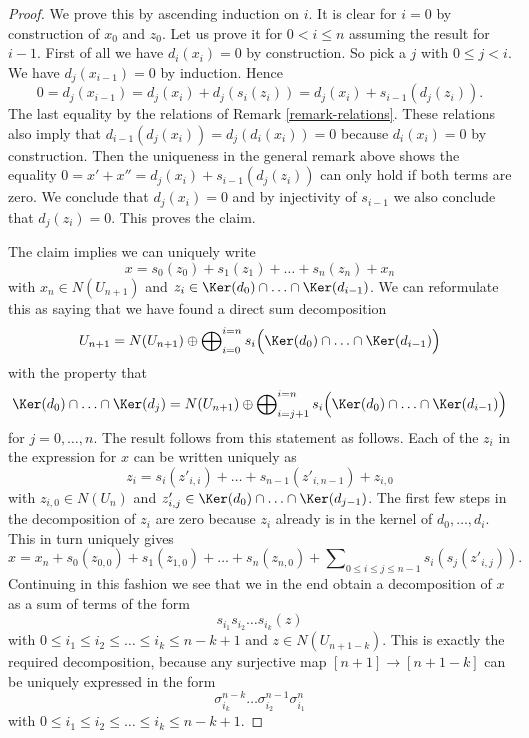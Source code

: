 \begin{proof}
\medskip\noindent
We prove this by ascending induction on $i$.
It is clear for $i = 0$ by construction of $x_0$ and $z_0$.
Let us prove it for $0 < i \leq n$ assuming the result for $i - 1$.
First of all we have $d_i(x_i) = 0$ by construction.
So pick a $j$ with $0 \leq j < i$. We have
$d_j(x_{i - 1}) = 0$ by induction. Hence
$$
0 = d_j(x_{i - 1})
= d_j(x_i) + d_j(s_i(z_i))
= d_j(x_i) + s_{i - 1}(d_j(z_i)).
$$
The last equality by the relations of Remark \ref{remark-relations}.
These relations also imply that
$d_{i - 1}(d_j(x_i)) = d_j(d_i(x_i)) = 0$
because $d_i(x_i)= 0$ by construction.
Then the uniqueness in the general remark above shows the equality
$0 = x' + x'' = d_j(x_i) + s_{i - 1}(d_j(z_i))$
can only hold if both terms are zero. We conclude that
$d_j(x_i) = 0$ and by injectivity of $s_{i - 1}$ we also
conclude that $d_j(z_i) = 0$. This proves the claim.

\medskip\noindent
The claim implies we can uniquely write
$$
x = s_0(z_0) + s_1(z_1) + \ldots + s_n(z_n) + x_n
$$
with $x_n \in N(U_{n + 1})$ and
$z_i \in \Ker(d_0) \cap \ldots \cap \Ker(d_{i - 1})$.
We can reformulate this as saying that we have found a direct
sum decomposition
$$
U_{n + 1}
=
N(U_{n + 1})
\oplus
\bigoplus\nolimits_{i = 0}^{i = n}
s_i\Big(\Ker(d_0) \cap \ldots \cap \Ker(d_{i - 1})\Big)
$$
with the property that
$$
\Ker(d_0) \cap \ldots \cap \Ker(d_j)
=
N(U_{n + 1}) \oplus
\bigoplus\nolimits_{i = j + 1}^{i = n}
s_i\Big(\Ker(d_0) \cap \ldots \cap \Ker(d_{i - 1})\Big)
$$
for $j = 0, \ldots, n$.
The result follows from this statement as follows.
Each of the $z_i$ in the expression for $x$
can be written uniquely as
$$
z_i = s_i(z'_{i, i}) + \ldots + s_{n - 1}(z'_{i, n - 1}) + z_{i, 0}
$$
with $z_{i, 0} \in N(U_n)$ and
$z'_{i, j} \in \Ker(d_0) \cap \ldots \cap \Ker(d_{j - 1})$.
The first few steps in the decomposition of $z_i$ are zero because
$z_i$ already is in the kernel of $d_0, \ldots, d_i$.
This in turn uniquely gives
$$
x = x_n + s_0(z_{0, 0}) + s_1(z_{1, 0}) + \ldots + s_n(z_{n, 0}) +
\sum\nolimits_{0 \leq i \leq j \leq n - 1} s_i(s_j(z'_{i, j})).
$$
Continuing in this fashion we see that we in the end obtain
a decomposition of $x$ as a sum of terms
of the form
$$
s_{i_1} s_{i_2} \ldots s_{i_k} (z)
$$
with $0 \leq i_1 \leq i_2 \leq \ldots \leq i_k \leq n - k + 1$ and
$z \in N(U_{n + 1 - k})$. This is exactly the required
decomposition, because any surjective map $[n + 1] \to [n + 1 - k]$
can be uniquely expressed in the form
$$
\sigma^{n - k}_{i_k} \ldots \sigma^{n - 1}_{i_2} \sigma^n_{i_1}
$$
with $0 \leq i_1 \leq i_2 \leq \ldots \leq i_k \leq n - k + 1$.
\end{proof}
